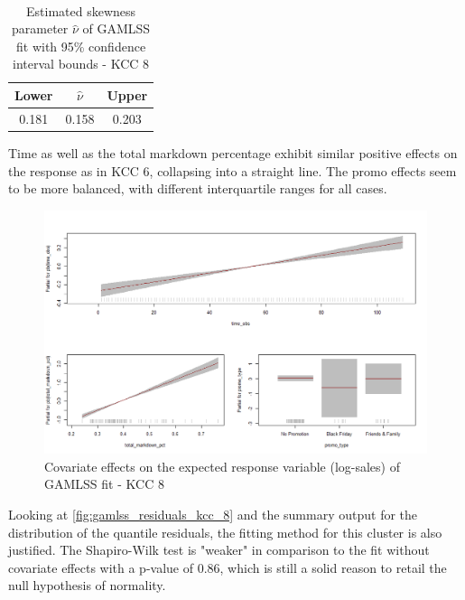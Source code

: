 \begin{table}[H]
\setlength\arrayrulewidth{1pt}  
\centering
\begin{adjustbox}{max width=\textwidth}\
\begin{tabular}{|c|c|c|}
\hline
\rowcolor{lightgray} 
Lower & $\hat{\nu}$ & Upper \\ \hline
0.181        & 0.158           & 0.203        \\ \hline
\end{tabular}
\end{adjustbox}
\caption{Estimated skewness parameter $\hat{\nu}$ of GAMLSS fit with 95\% confidence interval bounds - KCC 8}
\label{tab:nu_ci_kcc_8}
\end{table}



Time as well as the total markdown percentage exhibit similar positive effects on the response as in \ac{KCC} 6, collapsing into a straight line. The promo effects seem to be more balanced, with different interquartile ranges for all cases.
\\


\begin{figure}[H]
\centering
  \includegraphics[width=0.95\linewidth]{figures/gamlss_effects_kcc_8.png}
  \caption{Covariate effects on the expected response variable (log-sales) of GAMLSS fit - KCC 8}
  \label{fig:gamlss_effects_kcc_8}
\end{figure}



Looking at \autoref{fig:gamlss_residuals_kcc_8} and the summary output for the distribution of the quantile residuals, the fitting method for this cluster is also justified. The Shapiro-Wilk test is "weaker" in comparison to the fit without covariate effects with a p-value of 0.86, which is still a solid reason to retail the null hypothesis of normality.


